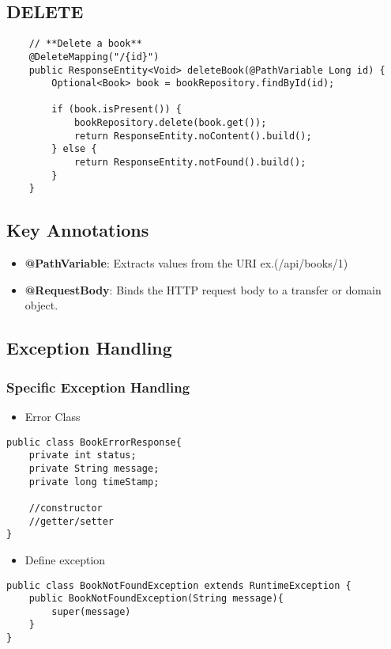 \documentclass[a4paper, 12pt]{article}
\begin{document}
    \subsection{DELETE}
    \begin{lstlisting}
    // **Delete a book**
    @DeleteMapping("/{id}")
    public ResponseEntity<Void> deleteBook(@PathVariable Long id) {
        Optional<Book> book = bookRepository.findById(id);

        if (book.isPresent()) {
            bookRepository.delete(book.get());
            return ResponseEntity.noContent().build();
        } else {
            return ResponseEntity.notFound().build();
        }
    }
    \end{lstlisting}

    \subsection{Key Annotations}
    \begin{itemize}
        \item \textbf{@PathVariable}: Extracts values from the URI ex.(/api/books/1)
        \item \textbf{@RequestBody}: Binds the HTTP request body to a transfer or domain object.
    \end{itemize}

    \subsection{Exception Handling}

    \subsubsection{Specific Exception Handling}
    \begin{itemize}
        \item Error Class
    \end{itemize}
    \begin{lstlisting}
public class BookErrorResponse{
    private int status;
    private String message;
    private long timeStamp;

    //constructor
    //getter/setter
}
    \end{lstlisting}
    \begin{itemize}
        \item Define exception
    \end{itemize}
    \begin{lstlisting}
public class BookNotFoundException extends RuntimeException {
    public BookNotFoundException(String message){
        super(message)
    }
}
    \end{lstlisting}
\end{document}
